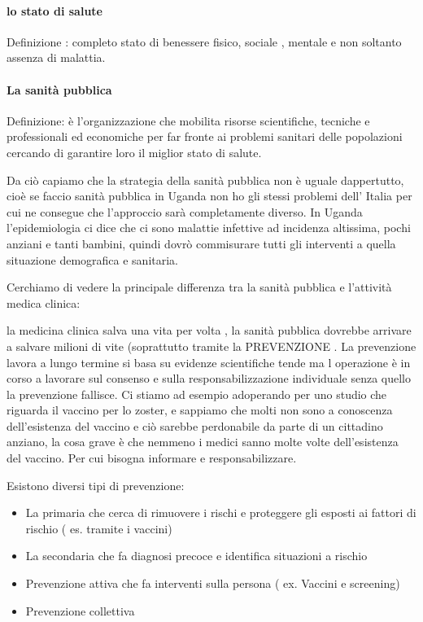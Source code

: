 \paragraph{lo stato di salute}
  

  Definizione : completo stato di benessere fisico, sociale , mentale e
  non soltanto assenza di malattia.

\paragraph{La sanità pubblica}
  

  Definizione: è l'organizzazione che mobilita risorse scientifiche,
  tecniche e professionali ed economiche per far fronte ai problemi
  sanitari delle popolazioni cercando di garantire loro il miglior stato
  di salute.

  Da ciò capiamo che la strategia della sanità pubblica non è uguale
  dappertutto, cioè se faccio sanità pubblica in Uganda non ho gli
  stessi problemi dell' Italia per cui ne consegue che l'approccio sarà
  completamente diverso. In Uganda l'epidemiologia ci dice che ci sono
  malattie infettive ad incidenza altissima, pochi anziani e tanti
  bambini, quindi dovrò commisurare tutti gli interventi a quella
  situazione demografica e sanitaria.

  Cerchiamo di vedere la principale differenza tra la sanità pubblica e
  l'attività medica clinica:

  la medicina clinica salva una vita per volta , la sanità pubblica
  dovrebbe arrivare a salvare milioni di vite (soprattutto tramite la
  PREVENZIONE . La prevenzione lavora a lungo termine si basa su
  evidenze scientifiche tende ma l operazione è in corso a lavorare sul
  consenso e sulla responsabilizzazione individuale senza quello la
  prevenzione fallisce. Ci stiamo ad esempio adoperando per uno studio
  che riguarda il vaccino per lo zoster, e sappiamo che molti non sono a
  conoscenza dell'esistenza del vaccino e ciò sarebbe perdonabile da
  parte di un cittadino anziano, la cosa grave è che nemmeno i medici
  sanno molte volte dell'esistenza del vaccino. Per cui bisogna
  informare e responsabilizzare.

  Esistono diversi tipi di prevenzione:
  \begin{itemize}

\item
  La primaria che cerca di rimuovere i rischi e proteggere gli esposti
  ai fattori di rischio ( es. tramite i vaccini)
\item
  La secondaria che fa diagnosi precoce e identifica situazioni a
  rischio
\item
  Prevenzione attiva che fa interventi sulla persona ( ex. Vaccini e
  screening)
\item
  Prevenzione collettiva
  \end{itemize}
